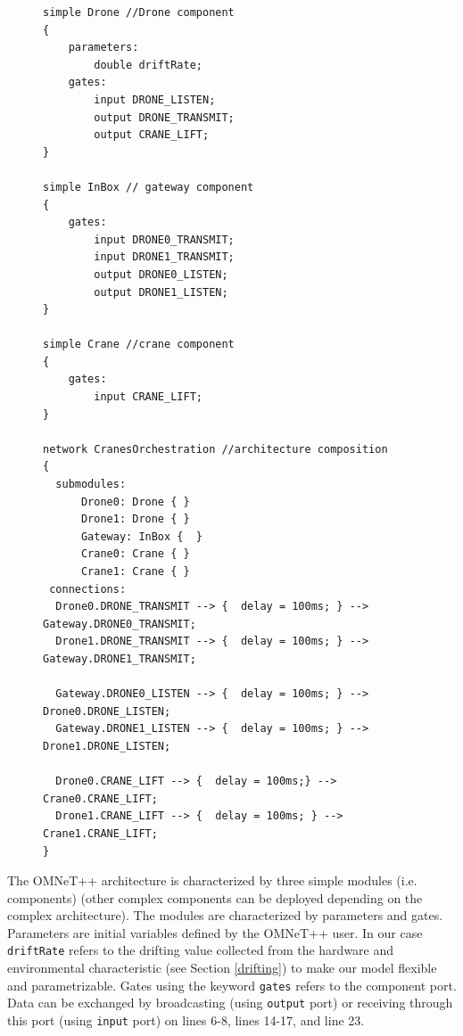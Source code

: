 

\begin{figure}[!htb]            
\begin{minipage}{16.5cm}
\begin{lstlisting}[style=framed,%customc,
	caption=Architecture of Cranes Lifting Orchestration via Drones,
 	label=omnetusecase]	
simple Drone //Drone component 
{
    parameters:
        double driftRate;
    gates:
        input DRONE_LISTEN;
        output DRONE_TRANSMIT;
        output CRANE_LIFT;
}

simple InBox // gateway component
{ 
    gates:
        input DRONE0_TRANSMIT;
        input DRONE1_TRANSMIT;
        output DRONE0_LISTEN;
        output DRONE1_LISTEN;
}

simple Crane //crane component
{
    gates:
        input CRANE_LIFT;
}

network CranesOrchestration //architecture composition
{
  submodules:
      Drone0: Drone { }
      Drone1: Drone { }
      Gateway: InBox {  }
      Crane0: Crane { }
      Crane1: Crane { }
 connections:
  Drone0.DRONE_TRANSMIT --> {  delay = 100ms; } --> Gateway.DRONE0_TRANSMIT;
  Drone1.DRONE_TRANSMIT --> {  delay = 100ms; } --> Gateway.DRONE1_TRANSMIT;

  Gateway.DRONE0_LISTEN --> {  delay = 100ms; } --> Drone0.DRONE_LISTEN;
  Gateway.DRONE1_LISTEN --> {  delay = 100ms; } --> Drone1.DRONE_LISTEN;

  Drone0.CRANE_LIFT --> {  delay = 100ms;} --> Crane0.CRANE_LIFT;
  Drone1.CRANE_LIFT --> {  delay = 100ms; } --> Crane1.CRANE_LIFT;
}
\end{lstlisting}
 \end{minipage}  
\end{figure}

The OMNeT++ architecture is characterized by three simple modules (i.e. components) (other complex components can be deployed depending on the complex architecture). The modules are characterized by parameters and gates. Parameters are initial variables defined by the OMNeT++ user. In our case \texttt{driftRate} refers to the drifting value collected from the hardware and environmental characteristic (see Section \ref{drifting}) to make our model flexible and parametrizable. Gates using the keyword \texttt{gates} refers to the  component port.  Data can be exchanged by broadcasting (using \texttt{output} port) or receiving through this port (using \texttt{input} port) on lines 6-8, lines 14-17, and line 23.



